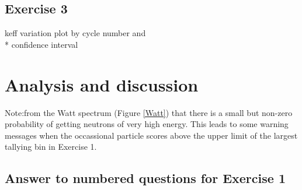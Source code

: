 \documentclass[a4paper, 12pt]{article}
\begin{document}
\subsection{Exercise 3}
keff variation plot by cycle number and \\* confidence interval

\section{Analysis and discussion}
Note:from the Watt spectrum (Figure \ref{Watt}) that there is a small but non-zero probability of getting neutrons of very high energy. This leads to some warning messages when the occassional particle scores above the upper limit of the largest tallying bin in Exercise 1.

\subsection{Answer to numbered questions for Exercise 1}\label{Ex1Ans}
\end{document}
